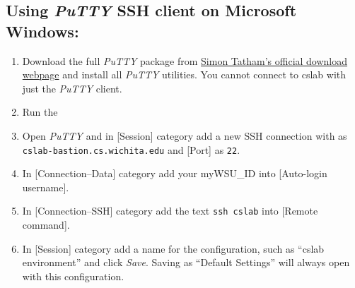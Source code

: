 \documentclass[12pt]{article}
\begin{document}
\subsection*{Using \textit{PuTTY} SSH client on Microsoft Windows:}
\begin{enumerate}

  \item Download the full \textit{PuTTY} package from \href{https://www.chiark.greenend.org.uk/~sgtatham/putty/latest.html}{Simon Tatham's official download webpage} and install all \textit{PuTTY} utilities. You cannot connect to cslab with just the \textit{PuTTY} client.
  \item Run the 

  \item Open \textit{PuTTY} and in [Session] category add a new SSH connection with  as \texttt{cslab-bastion.cs.wichita.edu} and [Port] as \texttt{22}.

  \item In [Connection--Data] category add your myWSU\_ID into [Auto-login username].
  \item In [Connection--SSH] category add the text \texttt{ssh cslab} into [Remote command].
  \item In [Session] category add a name for the configuration, such as ``cslab environment'' and click \textit{Save}. Saving as ``Default Settings'' will always open with this configuration.


\end{enumerate}
\end{document}
